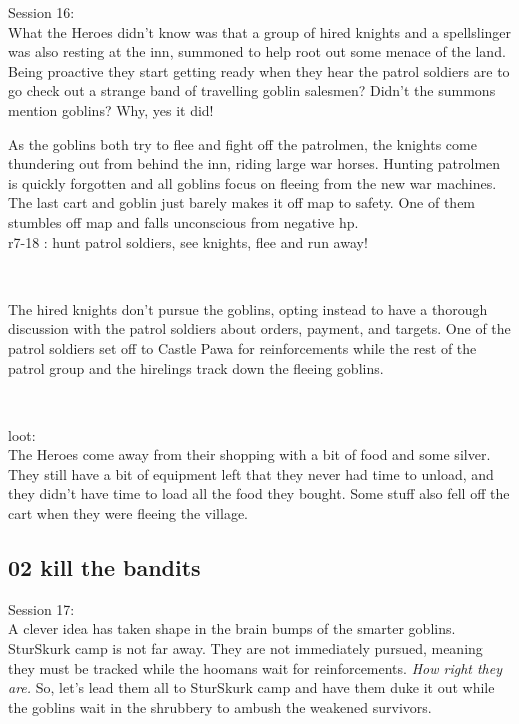 Session 16:\\                                                           %
What the Heroes didn't know was that a group of hired knights and a spellslinger was also resting at the inn, summoned to help root out some menace of the land. Being proactive they start getting ready when they hear the patrol soldiers are to go check out a strange band of travelling goblin salesmen? Didn't the summons mention goblins? Why, yes it did!

As the goblins both try to flee and fight off the patrolmen, the knights come thundering out from behind the inn, riding large war horses. Hunting patrolmen is quickly forgotten and all goblins focus on fleeing from the new war machines. The last cart and goblin just barely makes it off map to safety. One of them stumbles off map and falls unconscious from negative hp.\\
r7-18 : hunt patrol soldiers, see knights, flee and run away!

\

The hired knights don't pursue the goblins, opting instead to have a thorough discussion with the patrol soldiers about orders, payment, and targets. One of the patrol soldiers set off to Castle Pawa for reinforcements while the rest of the patrol group and the hirelings track down the fleeing goblins.

\

loot:\\
The Heroes come away from their shopping with a bit of food and some silver. They still have a bit of equipment left that they never had time to unload, and they didn't have time to load all the food they bought. Some stuff also fell off the cart when they were fleeing the village.


\subsection*{02 kill the bandits}
\label{playthroughkillthebandits}

\forceindent Session 17:\\                                              %
A clever idea has taken shape in the brain bumps of the smarter goblins. SturSkurk camp is not far away. They are not immediately pursued, meaning they must be tracked while the hoomans wait for reinforcements. \emph{How right they are.} So, let's lead them all to SturSkurk camp and have them duke it out while the goblins wait in the shrubbery to ambush the weakened survivors.

